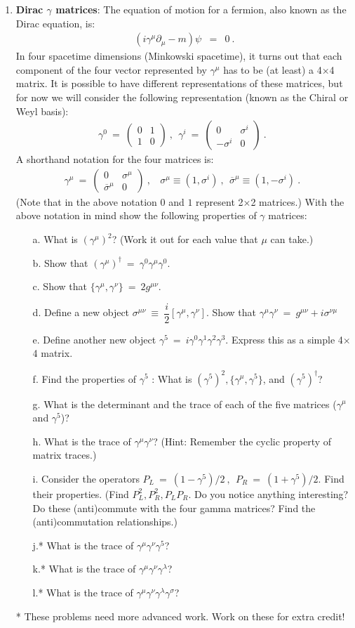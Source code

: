\documentclass[12pt]{article}
\def \bea{\begin{eqnarray}}
\def \eea{\end{eqnarray}}
\def \bmat{\begin{matrix}}
\def \emat{\end{matrix}}
\def \({\left(}
\def \){\right)}
\def \bma{\(\bmat}
\def \ema{\emat\)}
\def \osi{\overline{\si}}
\def \ga{\gamma}
\def \la{\lambda}
\def \si{\sigma}
\def \pa{\partial}
\begin{document}
\begin{enumerate}
\item {\bf Dirac $\ga$ matrices}: The equation of motion for a fermion, also known as the
Dirac equation, is:
\bea
(i\ga^\mu\pa_\mu - m)\psi &=& 0 ~.
\eea
In four spacetime dimensions (Minkowski spacetime), it turns out that each component
of the four vector represented by $\ga^\mu$ has to be (at least) a 4$\times$4 matrix.
It is possible to have different representations of these matrices, but for now we will
consider the following representation (known as the Chiral or Weyl basis):
%
\bea
\ga^0 ~=~ \bma 0 & 1 \\ 1 & 0 \ema ~,~~ \ga^i ~=~ \bma 0 & \si^i \\ -\si^i & 0 \ema ~.~~
\eea
%
A shorthand notation for the four matrices is:
%
\bea
\ga^\mu ~=~ \bma 0 & \si^\mu \\ \osi^\mu & 0 \ema ~,~~~~ \si^\mu \equiv (1 , \si^i) ~,~~
\osi^\mu \equiv (1, -\si^i) ~.~~
\eea
%
(Note that in the above notation $0$ and $1$ represent 2$\times$2 matrices.)
With the above notation in mind show the following properties of $\ga$ matrices:
\begin{enumerate}
 \item [a.] What is $(\ga^\mu)^2$? (Work it out for each value that $\mu$ can take.)
 \item [b.] Show that $(\ga^\mu)^\dag ~=~ \ga^0\ga^\mu\ga^0$.
 \item [c.] Show that $\{\ga^\mu,\ga^\nu\} ~=~ 2g^{\mu\nu}$.
 \item [d.] Define a new object $\si^{\mu\nu} ~\equiv~ \dfrac{i}{2}[\ga^\mu,\ga^\nu]$.
 Show that $\ga^\mu\ga^\nu ~=~ g^{\mu\nu} + i\si^{\nu\mu}$
 \item [e.] Define another new object $\ga^5 ~=~ i\ga^0\ga^1\ga^2\ga^3$. Express this
 as a simple 4$\times$4 matrix.
 \item [f.] Find the properties of $\ga^5$ : What is $(\ga^5)^2, \{\ga^\mu,\ga^5\}$,
 and $(\ga^5)^\dag$?
 \item [g.] What is the determinant and the trace of each of the five matrices ($\ga^\mu$
 and $\ga^5$)?
 \item [h.] What is the trace of $\ga^\mu\ga^\nu$? (Hint: Remember the cyclic property of
 matrix traces.)
 \item [i.] Consider the operators $P_L ~=~ (1 - \ga^5)/2~,~~ P_R ~=~ (1 + \ga^5)/2$. Find
 their properties. (Find $P_L^2, P_R^2, P_LP_R$. Do you notice anything interesting? Do
 these (anti)commute with the four gamma matrices? Find the (anti)commutation relationships.)
 \item [j.*] What is the trace of $\ga^\mu\ga^\nu\ga^5$?
 \item [k.*] What is the trace of $\ga^\mu\ga^\nu\ga^\la$?
 \item [l.*] What is the trace of $\ga^\mu\ga^\nu\ga^\la\ga^\si$?
\end{enumerate}
* These problems need more advanced work. Work on these for extra credit!
\end{enumerate}
\end{document}
